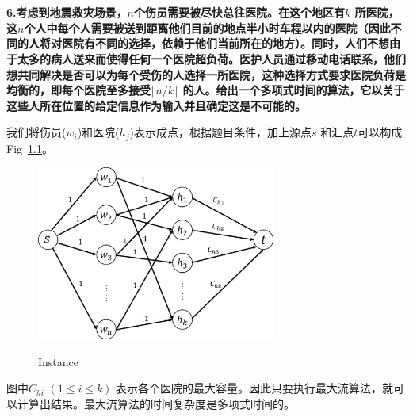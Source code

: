 
\chapter{}
\textbf{
6.考虑到地震救灾场景，$n$个伤员需要被尽快总往医院。在这个地区有$k$ 所医院，这$n$个人中每个人需要被送到距离他们目前的地点半小时车程以内的医院（因此不同的人将对医院有不同的选择，依赖于他们当前所在的地方）。同时，人们不想由于太多的病人送来而使得任何一个医院超负荷。医护人员通过移动电话联系，他们想共同解决是否可以为每个受伤的人选择一所医院，这种选择方式要求医院负荷是均衡的，即每个医院至多接受$\lceil n/k\rceil$ 的人。给出一个多项式时间的算法，它以关于这些人所在位置的给定信息作为输入并且确定这是不可能的。
}

我们将伤员($w_i$)和医院($h_j$)表示成点，根据题目条件，加上源点$s$ 和汇点$t$可以构成Fig~\ref{q6_1}。
\begin{figure}[H]
  \centering
  \includegraphics[width=0.7\textwidth]{figures/4.eps}\\
  \caption{Instance}\label{q6_1}
\end{figure}
图中$C_{hi}$ $(1\leq i\leq k)$ 表示各个医院的最大容量。因此只要执行最大流算法，就可以计算出结果。最大流算法的时间复杂度是多项式时间的。